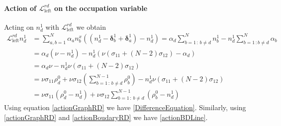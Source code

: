 \documentclass[10pt]{article}
\numberwithin{equation}{section}
\numberwithin{equation}{subsection}
\begin{document}
\paragraph{Action of $\mathcal{L}_{\text{left}}^{rd}$ on the occupation variable}
Acting on $n_{d}^{1}$  with $\mathcal{L}_{\text{left}}^{rd}$ we obtain
\begin{equation}\label{actionBoudaryRD}
	\begin{split}
		\mathcal{L}_{\text{left}}^{rd}n_{d}^{1}&=\sum_{a,b=1}^{N}\alpha_{a}n_{b}^{x}\left((n_{d}^{1}-\bm{\delta}_{b}^{1}+\bm{\delta}_{a}^{1})-n_{d}^{1}\right)=\alpha_{d}\sum_{b=1\,:\,b\neq d}^{N}n_{b}^{1}-n_{d}^{1}\sum_{b=1\,:b\neq d}^{N}\alpha_{b}
		\\&=
		\alpha_{d}\left(\nu-n_{d}^{1}\right)-n_{d}^{1}\left(\nu(\sigma_{11}+(N-2)\sigma_{12})-\alpha_{d}\right)
		\\&=\alpha_{d}\nu-n_{d}^{1}\nu(\sigma_{11}+(N-2)\sigma_{12})
		\\&=
		\nu\sigma_{11}\rho_{d}^{0}+\nu\sigma_{12}\left(\sum_{b=1\,:\,b\neq d}^{N-1}\rho_{b}^{0}\right)-n_{d}^{1}\nu(\sigma_{11}+(N-2)\sigma_{12})
		\\&=
		\nu \sigma_{11} (\rho_{d}^{0}-n_{d}^{1})+\nu\sigma_{12}\sum_{b=1\,:\,b\neq d}^{N-1}(\rho_{b}^{0}-n_{d}^{1})
	\end{split}
\end{equation}
Using equation \eqref{actionGraphRD} we have \eqref{DifferenceEquation}. Similarly, using \eqref{actionGraphRD}  and \eqref{actionBoudaryRD} we have \eqref{actionBDLine}.
\end{document}
